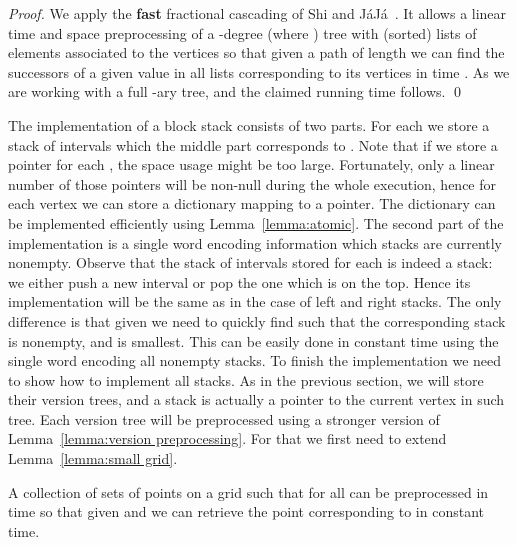 \documentclass[runningheads]{llncs}
\begin{document}
\begin{proof}
We apply the {\bf fast} fractional cascading of Shi and  J{\'a}J{\'a}~\cite{Jaja}. It allows a linear time and space preprocessing of a -degree (where ) tree with (sorted) lists of elements associated to the vertices so that given a path of length  we can find the successors of a given value in all lists corresponding to its vertices in time . As we are working with a full -ary tree,  and the claimed running time follows.
\qed
\end{proof}

The implementation of a block stack consists of two parts. For each  we store a stack of intervals which the middle part corresponds to . Note that if we store a pointer for each , the space usage might be too large. Fortunately, only a linear number of those pointers will be non-null during the whole execution, hence for each vertex we can store a dictionary mapping  to a pointer. The dictionary can be implemented efficiently using Lemma~\ref{lemma:atomic}. The second part of the implementation is a single word encoding information which stacks are currently nonempty. Observe that the stack of intervals stored for each  is indeed a stack: we either push a new interval or pop the one which is on the top. Hence its implementation will be the same as in the case of left and right stacks. The only difference is that given  we need to quickly find  such that the corresponding stack is nonempty,  and  is smallest. This can be easily done in constant time using the single word encoding all nonempty stacks. To finish the implementation we need to show how to implement all stacks. As in the previous section, we will store their version trees, and a stack is actually a pointer to the current vertex in such tree. Each version tree will be preprocessed using a stronger version of Lemma~\ref{lemma:version preprocessing}. For that we first need to extend Lemma~\ref{lemma:small grid}.

\begin{lemma}\label{lemma:fast small grid}
A collection of  sets of points  on a  grid such that  for all  can be preprocessed in  time so that given  and  we can retrieve the point corresponding to  in constant time.
\end{lemma}
\end{document}
